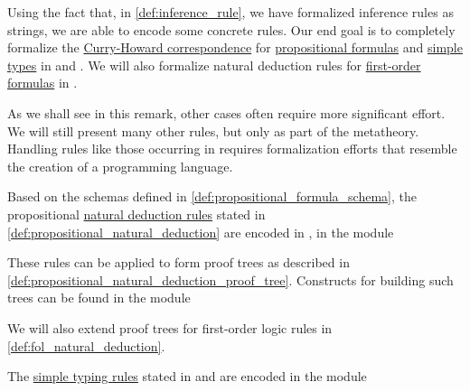 \begin{remark}\label{rem:inference_rule_formalization}
  Using the fact that, in \cref{def:inference_rule}, we have formalized inference rules as strings, we are able to encode some concrete rules. Our end goal is to completely formalize the \hyperref[con:curry_howard_correspondence]{Curry-Howard correspondence} for \hyperref[def:propositional_formula]{propositional formulas} and \hyperref[def:simple_type]{simple types} in  and . We will also formalize natural deduction rules for \hyperref[def:fol_formula]{first-order formulas} in .

  As we shall see in this remark, other cases often require more significant effort. We will still present many other rules, but only as part of the metatheory. Handling rules like those occurring in  requires formalization efforts that resemble the creation of a programming language.

  \begin{itemize}
     Based on the schemas defined in \cref{def:propositional_formula_schema}, the propositional \hyperref[def:natural_deduction_rule]{natural deduction rules} stated in \cref{def:propositional_natural_deduction} are encoded in \cite{notebook:code}, in the module
    \begin{CodeRefDisplay}
    \end{CodeRefDisplay}

    These rules can be applied to form proof trees as described in \cref{def:propositional_natural_deduction_proof_tree}. Constructs for building such trees can be found in the module
    \begin{CodeRefDisplay}
    \end{CodeRefDisplay}

    We will also extend proof trees for first-order logic rules in \cref{def:fol_natural_deduction}.

     The \hyperref[def:simple_typing_rule]{simple typing rules} stated in  and  are encoded in the module
    \begin{CodeRefDisplay}
    \end{CodeRefDisplay}


\end{itemize}
\end{remark}

